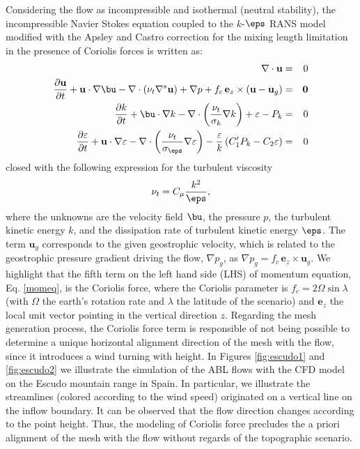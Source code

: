 \documentclass[1p]{elsarticle}
\begin{document}
Considering the flow as incompressible and isothermal (neutral stability), the incompressible Navier Stokes equation coupled to the $k$-$\eps$ RANS model modified with the Apsley and Castro correction  for the mixing length limitation \cite{Apsley} in the presence of Coriolis forces is written as:
\begin{eqnarray}
	\nabla \cdot \mathbf{u} 
	&=& 0 \label{masseq} \\ 
	\frac{\partial \mathbf{u}}{\partial t} + \mathbf{u}\cdot \nabla \bu-\nabla \cdot 
	\left( \nu _t \nabla ^{s}\mathbf{u}\right)+  \nabla p + f_c\, \mathbf{ e}_z \times \left(\mathbf{u} -\mathbf u_g\right)  
	&=&
	\mathbf 0 \label{momeq} \\ 
	\frac{\partial k}{\partial t} +
	\bu\cdot \nabla k -\nabla \cdot \left(   
	\frac{\nu_t }{\sigma _{k}}  \nabla k\right)  
	+ \varepsilon - P_k  
	&=& 0  \label{keyeq} \\
	\frac{\partial \varepsilon }{\partial t} + \mathbf{u}\cdot \nabla
	\varepsilon -\nabla \cdot \left(\frac{\nu_t}{\sigma_\eps}
	\nabla \varepsilon \right) 
	-\frac{\varepsilon}{k}\left(C_{1}^\prime P_k - C_2\varepsilon  \right) &=&
	0  \label{epseq}
\end{eqnarray}
closed with the following expression for the turbulent viscosity
\begin{equation}
  \nu_t = C_\mu\frac{k^2}{\eps},
  \label{turvieq}
\end{equation}    
where the unknowns are the velocity field $\bu$, the  pressure $p$, the turbulent kinetic energy $k$, and the dissipation rate of turbulent kinetic energy
$\eps$. 
The term  $\mathbf u_g$ corresponds to the given geostrophic velocity, which is related to the geostrophic pressure gradient driving the flow, $\nabla p_g$, as $\nabla p_g=f_c\, \mathbf{ e}_z \times \mathbf u_g $.
We highlight that the fifth term on the left hand side (LHS) of momentum equation, Eq. \eqref{momeq}, is the Coriolis force, 
where the Coriolis parameter is $f_c=2\Omega \sin \lambda$  (with  $\Omega$ the earth's rotation rate and  $\lambda$ the latitude of the scenario) and $\mathbf{e}_z$ the local unit vector pointing in the vertical direction $z$. 
Regarding the mesh generation process, the Coriolis force term is responsible of not being possible to determine a unique horizontal alignment direction of the mesh with the flow, since it introduces a wind turning with height.
In Figures \ref{fig:escudo1} and \ref{fig:escudo2} we illustrate the simulation of the ABL flows with the CFD model on the Escudo mountain range in Spain.
In particular, we illustrate the streamlines (colored according to the wind speed) originated on a vertical line on the inflow boundary. It can be observed that the flow direction changes according to the point height.
Thus, the modeling of Coriolis force precludes the a priori alignment of the mesh with the flow without regards of the topographic scenario.
\end{document}
